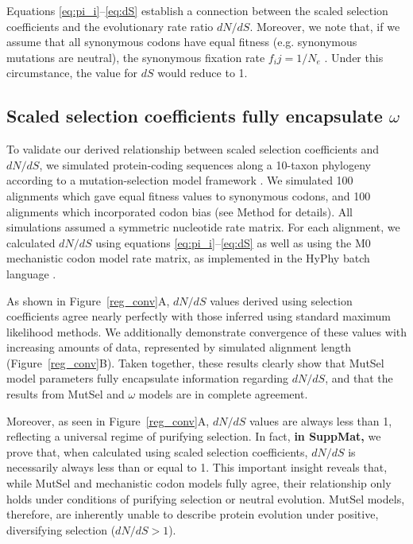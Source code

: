 \documentclass[11pt]{article}
\begin{document}
Equations \eqref{eq:pi_i}--\eqref{eq:dS} establish a connection between the scaled selection coefficients and the evolutionary rate ratio $dN/dS$. Moreover, we note that, if we assume that all synonymous codons have equal fitness (e.g. synonymous mutations are neutral), the synonymous fixation rate $f_ij = 1/N_e$ \cite{CrowKimura1970}. Under this circumstance, the value for $dS$ would reduce to 1.


\subsection*{Scaled selection coefficients fully encapsulate $\omega$}

To validate our derived relationship between scaled selection coefficients and $dN/dS$, we simulated protein-coding sequences along a 10-taxon phylogeny according to a mutation-selection model framework \cite{HalpernBruno1998,SellaHirsh2005}. We simulated 100 alignments which gave equal fitness values to synonymous codons, and 100 alignments which incorporated codon bias (see Method for details). All simulations assumed a symmetric nucleotide rate matrix. For each alignment, we calculated $dN/dS$ using equations \eqref{eq:pi_i}--\eqref{eq:dS} as well as using the M0 mechanistic codon model \cite{GoldmanYang1994,NielsenYang1998,Yangetal2000} rate matrix, as implemented in the HyPhy batch language \cite{KosakovskyPondetal2005}.

As shown in Figure~\ref{reg_conv}A, $dN/dS$ values derived using selection coefficients agree nearly perfectly with those inferred using standard maximum likelihood methods. We additionally demonstrate convergence of these values with increasing amounts of data, represented by simulated alignment length (Figure~\ref{reg_conv}B). Taken together, these results clearly show that MutSel model parameters fully encapsulate information regarding $dN/dS$, and that the results from MutSel and $\omega$ models are in complete agreement. 

Moreover, as seen in Figure~\ref{reg_conv}A, $dN/dS$ values are always less than 1, reflecting a universal regime of purifying selection. In fact, \textbf{in SuppMat,} we prove that, when calculated using scaled selection coefficients, $dN/dS$ is necessarily always less than or equal to 1. This important insight reveals that, while MutSel and mechanistic codon models fully agree, their relationship only holds under conditions of purifying selection or neutral evolution. MutSel models, therefore, are inherently unable to describe protein evolution under positive, diversifying selection ($dN/dS > 1$).
\end{document}
